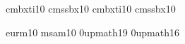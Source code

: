 %


%
%

\newif\ifAMStwofonts




\ifoldfss
  \newcommand{\rmn}[1] {{\rm #1}}
  \newcommand{\itl}[1] {{\it #1}}
  \newcommand{\bld}[1] {{\bf #1}}
  \ifCUPmtlplainloaded \else
     {cmbxti10} {}
     {cmssbx10} {}
     {cmbxti10} {} %
     {cmssbx10} {} %
  \fi
  \ifAMStwofonts
    \ifCUPmtlplainloaded \else
       {eurm10}
       {msam10}
      \NewMathSymbol{\upi}     {0}{upmath}{19}
      \NewMathSymbol{\umu}     {0}{upmath}{16}
      \let\oldle=\le     \let\oldleq=\leq
      \let\oldge=\ge     \let\oldgeq=\geq
      \let\leq=\leqslant \let\le=\leqslant
      \let\geq=\geqslant \let\ge=\geqslant
    \fi
  \fi
%
\fi %

